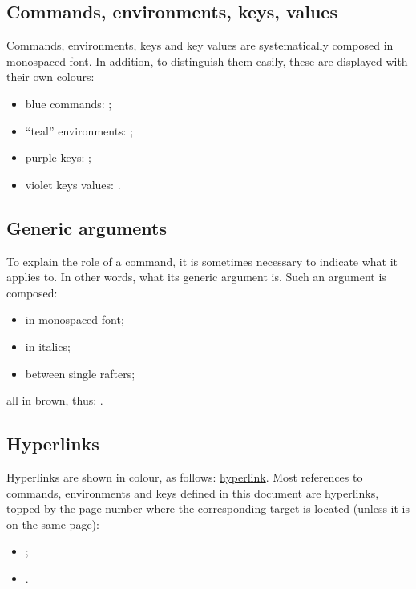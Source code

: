 \documentclass[english,nolocaltoc]{nwejmart}
\newtheorem[style=definition]{fact}
\newtheorem[title=experience]{experience}
\newtheorem[title-plural=rings]{ring}
\newtheorem[title=ideal,title-plural=ideals]{ideal}
\begin{document}
\subsection{Commands, environments, keys, values}\label{sec-comm-envir-cles}

Commands, environments, keys and key values are systematically composed
in monospaced font. In addition, to distinguish them easily, these are
displayed with their own colours: 
\begin{itemize}
\item blue commands: ;
\item \enquote{teal} environments:
  ;
\item purple keys: ;
\item violet keys values: .
\end{itemize}

\subsection{Generic arguments}
\label{sec-arguments-generiques}

To explain the role of a command, it is sometimes necessary to
indicate what it applies to. In other words, what its generic argument
is.  Such an argument is composed:
\begin{itemize}
\item in monospaced  font;
\item in italics;
\item between single rafters;
\end{itemize}
all in brown, thus: .

\subsection{Hyperlinks}
\label{sec-liens-hypertextes}

Hyperlinks are shown in colour, as follows:
\href{http://gte.univ-littoral.fr/members/dbitouze/pub/latex}{hyperlink}. Most
references to commands, environments and keys defined in this document
are hyperlinks, topped by the page number where the corresponding
target is located (unless it is on the same page):
\begin{itemize}
\item {};
\item {}.
\end{itemize}
\end{document}
